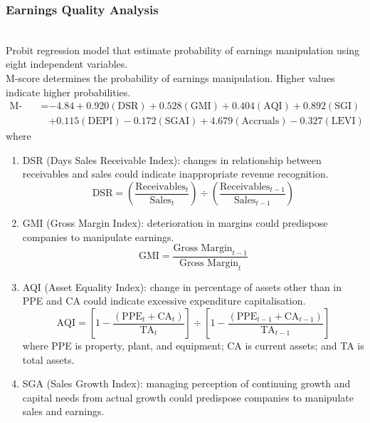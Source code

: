 \subsubsection{Earnings Quality Analysis}

\begin{definition} \\
Probit regression model that estimate probability of earnings manipulation using eight independent variables.\\
M-score determines the probability of earnings manipulation. Higher values indicate higher probabilities.
\begin{align}
\text{M-Score} = &-4.84 + 0.920(\text{DSR}) + 0.528(\text{GMI}) + 0.404(\text{AQI}) + 0.892(\text{SGI}) \nonumber \\
&+ 0.115(\text{DEPI}) - 0.172(\text{SGAI}) + 4.679(\text{Accruals}) - 0.327(\text{LEVI}) \nonumber
\end{align}
where
\begin{enumerate}[label=\roman*.]
\setlength{\itemsep}{0pt}
\item DSR (Days Sales Receivable Index): changes in relationship between receivables and sales could indicate inappropriate revenue recognition.
\begin{equation}
\text{DSR} = \left(\frac{\text{Receivables}_t}{\text{Sales}_t} \right) \div \left(\frac{\text{Receivables}_{t-1}}{\text{Sales}_{t-1}} \right) \nonumber
\end{equation}
\item GMI (Gross Margin Index): deterioration in margins could predispose companies to manipulate earnings.
\begin{equation}
\text{GMI} = \frac{\text{Gross Margin}_{t-1}}{\text{Gross Margin}_{t}} \nonumber
\end{equation}
\item AQI (Asset Equality Index): change in percentage of assets other than in PPE and CA could indicate excessive expenditure capitalisation.
\begin{equation}
\text{AQI} = \left[1- \frac{(\text{PPE}_t + \text{CA}_t)}{\text{TA}_t} \right] \div \left[1- \frac{(\text{PPE}_{t-1} + \text{CA}_{t-1})}{\text{TA}_{t-1}} \right] \nonumber
\end{equation}
where PPE is property, plant, and equipment; CA is current assets; and TA is total assets.
\item SGA (Sales Growth Index): managing perception of continuing growth and capital needs from actual growth could predispose companies to manipulate sales and earnings.

\end{enumerate}
\end{definition}
